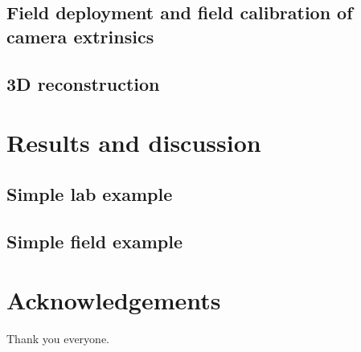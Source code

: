 \documentclass[fleqn,10pt]{wlpeerj}
\begin{document}
\subsection*{Field deployment and field calibration of camera extrinsics}
\subsection*{3D reconstruction}

\section*{Results and discussion}
\subsection*{Simple lab example}
\subsection*{Simple field example}

\section*{Acknowledgements}
Thank you everyone.


\end{document}
